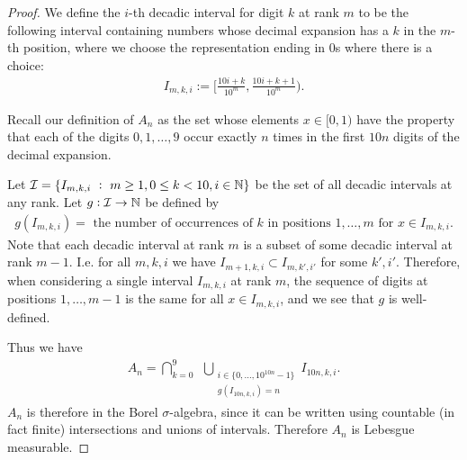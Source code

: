 \begin{enumerate}[label=(\alph*)]
\begin{proof}
  We define the $i$-th decadic interval for digit $k$ at rank $m$ to be the following interval containing
  numbers whose decimal expansion has a $k$ in the $m$-th position, where we choose the representation ending
  in $0$s where there is a choice:
  \begin{align*}
    I_{m, k, i} := \Bigg[\frac{10i + k}{10^m}, \frac{10i + k + 1}{10^m}\Bigg).
  \end{align*}

  Recall our definition of $A_n$ as the set whose elements $x \in [0, 1)$ have the property that each of the
  digits $0, 1, \ldots, 9$ occur exactly $n$ times in the first $10n$ digits of the decimal expansion.

  Let $\mathcal I = \{I_{m, k, i} ~:~ m \geq 1, 0 \leq k < 10, i \in \mathbb{N}\}$ be the set of all decadic intervals at any
  rank. Let $g:\mathcal I \to \mathbb{N}$ be defined by
  \begin{align*}
    g(I_{m, k, i}) = \text{~the number of occurrences of $k$ in positions $1, \ldots, m$ for $x \in I_{m, k, i}$}.
  \end{align*}
  Note that each decadic interval at rank $m$ is a subset of some decadic interval at rank $m-1$. I.e. for
  all $m, k, i$ we have $I_{m+1, k, i} \subset I_{m, k', i'}$ for some $k', i'$. Therefore, when considering a
  single interval $I_{m, k, i}$ at rank $m$, the sequence of digits at positions $1, \dots, m-1$ is the same
  for all $x \in I_{m, k, i}$, and we see that $g$ is well-defined.

  Thus we have
  \begin{align*}
    A_n = \bigcap_{k=0}^{9} ~~ \bigcup_{\substack{i\in \{0, \ldots, 10^{10n} - 1\}\\g(I_{10n, k, i}) = n}} I_{10n, k, i}.
  \end{align*}
  $A_n$ is therefore in the Borel $\sigma$-algebra, since it can be written using countable (in fact finite)
  intersections and unions of intervals. Therefore $A_n$ is Lebesgue measurable.


\end{proof}
\end{enumerate}
